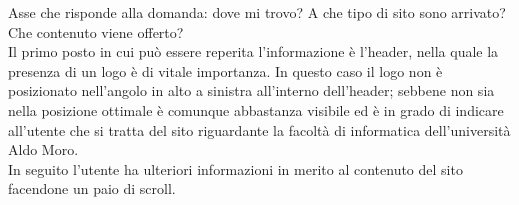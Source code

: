Asse che risponde alla domanda: dove mi trovo? A che tipo di sito sono arrivato? Che contenuto viene offerto? \\
Il primo posto in cui può essere reperita l'informazione è l'header, nella quale la presenza di un logo è di vitale importanza. In questo caso il logo non è posizionato nell'angolo in alto a sinistra all'interno dell'header; sebbene non sia nella posizione ottimale è comunque abbastanza visibile ed è in grado di indicare all'utente che si tratta del sito riguardante la facoltà di informatica dell'università Aldo Moro.\\
In seguito l'utente ha ulteriori informazioni in merito al contenuto del sito facendone un paio di scroll.
